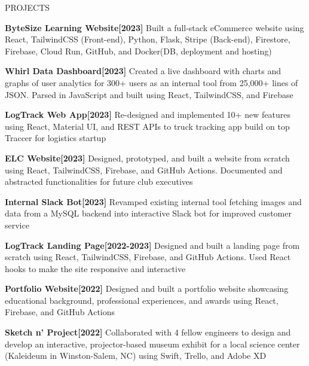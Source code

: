 \documentclass{resume} %
\begin{document}
\begin{rSection}{PROJECTS}
\vspace{-1.25em}
\item \textbf{ByteSize Learning Website[2023]} {Built a full-stack eCommerce website using React, TailwindCSS (Front-end), Python, Flask, Stripe (Back-end), Firestore, Firebase, Cloud Run, GitHub, and Docker(DB, deployment and hosting)}
\item \textbf{Whirl Data Dashboard[2023]} {Created a live dashboard with charts and graphs of user analytics for 300+ users as an internal tool from 25,000+ lines of JSON. Parsed in JavaScript and built using React, TailwindCSS, and Firebase}
\item \textbf {LogTrack Web App[2023]} {Re-designed and implemented 10+ new features using React, Material UI, and REST APIs to truck tracking app build on top Traccer for logistics startup}
\item \textbf{ELC Website[2023]} {Designed, prototyped, and built a website from scratch using React, TailwindCSS, Firebase, and GitHub Actions. Documented and abstracted functionalities for future club executives}
\item \textbf{Internal Slack Bot[2023]} {Revamped existing internal tool fetching images and data from a MySQL backend into interactive Slack bot for improved customer service}
\item \textbf {LogTrack Landing Page[2022-2023]} {Designed and built a landing page from scratch using React, TailwindCSS, Firebase, and GitHub Actions. Used React hooks to make the site responsive and interactive}
\item \textbf {Portfolio Website[2022]} {Designed and built a portfolio website showcasing educational background, professional experiences, and awards using React, Firebase, and GitHub Actions}
\item \textbf{Sketch n' Project[2022]} {Collaborated with 4 fellow engineers to design and develop an interactive, projector-based museum exhibit for a local science center (Kaleideum in Winston-Salem, NC) using Swift, Trello, and Adobe XD}

\end{rSection} 
\end{document}
